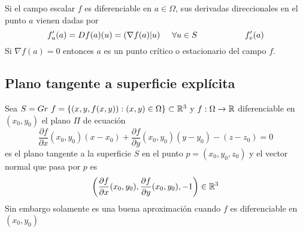 Si el campo escalar $f$ es diferenciable en $a\in\Omega$, sus derivadas direccionales en el punto $a$ vienen dadas por
$$ f_u'(a) = Df(a)(u) = (\nabla f(a) | u) \hspace{0.5cm} \forall u\in S\hspace{2cm}
f_v'(a)$$
Si $\nabla f(a)=0$ entonces $a$  es un punto crítico o estacionario del campo $f$.

\subsection{Plano tangente a superficie explícita}
Sea $S=Gr\ f = \{ (x,y,f(x,y)) : (x,y)\in\Omega \} \subset \mathbb{R}^3$ y $f:\Omega\rightarrow\mathbb{R}$ diferenciable en $(x_0,y_0)$ el plano $\Pi$ de ecuación
$$ \frac{\partial f}{\partial x} (x_0,y_0)(x-x_0) + \frac{\partial f}{\partial y}(x_0,y_0)(y-y_0)-(z-z_0) = 0 $$
es el plano tangente a la superficie $S$ en el punto $p=(x_0,y_0,z_0)$ y el vector normal que pasa por $p$ es
$$ \left( \frac{\partial f}{\partial x} (x_0,y_0), \frac{\partial f}{\partial y}(x_0,y_0), -1 \right) \in\mathbb{R}^3$$
Sin embargo solamente es una buena aproximación cuando $f$ es diferenciable en $(x_0,y_0)$